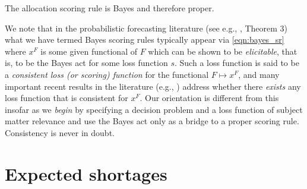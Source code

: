 \documentclass{article}
\begin{document}
The allocation scoring rule is Bayes and therefore proper.

We note that in the probabilistic forecasting literature (see e.g., \cite{gneiting2011making}, Theorem 3) what we have 
termed Bayes scoring rules typically appear via \eqref{eqn:bayes_sr} where $x^F$ is some given functional of $F$ which 
can be shown to be \emph{elicitable}, that is, to be the Bayes act for some loss function $s$.
Such a loss function is said to be a \emph{consistent loss (or scoring) function} for the functional $F \mapsto x^F$, and many important
recent results in the literature (e.g., \cite{fisslerziegel2016consistency}) address whether there \emph{exists} any loss 
function that is consistent for $x^F$. Our orientation
is different from this insofar as we \emph{begin} by specifying a decision problem and a loss function of subject matter relevance
and use the Bayes act only as a bridge to a proper scoring rule.  Consistency is never in doubt.


\section{Expected shortages}
\label{sec:ex-shortage}
\end{document}
